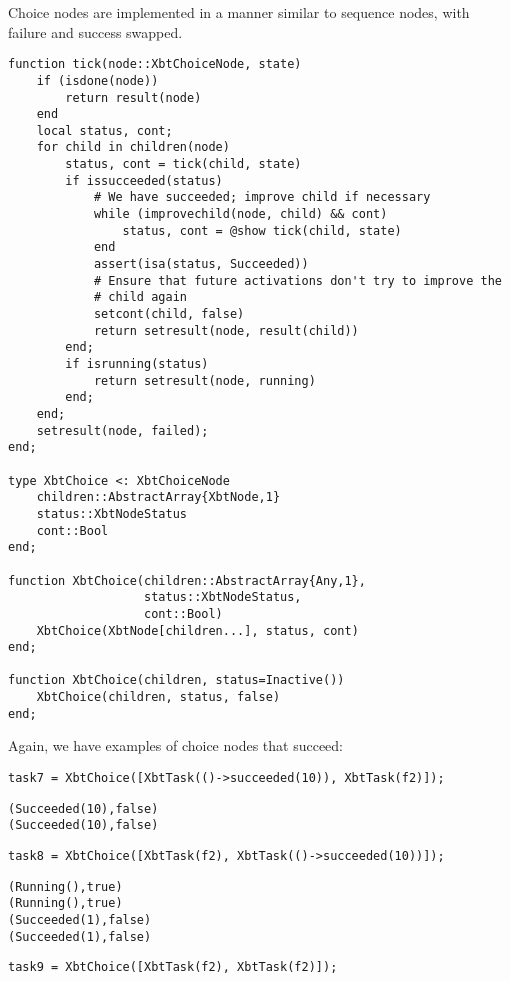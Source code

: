 \documentclass[a4wide]{article}
\begin{document}
Choice nodes are implemented in a manner similar to sequence
nodes, with failure and success swapped.

\begin{verbatim}
function tick(node::XbtChoiceNode, state)
    if (isdone(node))
        return result(node)
    end
    local status, cont;
    for child in children(node)
        status, cont = tick(child, state)
        if issucceeded(status)
            # We have succeeded; improve child if necessary
            while (improvechild(node, child) && cont)
                status, cont = @show tick(child, state)
            end
            assert(isa(status, Succeeded))
            # Ensure that future activations don't try to improve the
            # child again
            setcont(child, false)
            return setresult(node, result(child))
        end;
        if isrunning(status)
            return setresult(node, running)
        end;
    end;
    setresult(node, failed);
end;

type XbtChoice <: XbtChoiceNode
    children::AbstractArray{XbtNode,1}
    status::XbtNodeStatus
    cont::Bool
end;

function XbtChoice(children::AbstractArray{Any,1},
                   status::XbtNodeStatus,
                   cont::Bool)
    XbtChoice(XbtNode[children...], status, cont)
end;

function XbtChoice(children, status=Inactive())
    XbtChoice(children, status, false)
end;
\end{verbatim}

Again, we have examples of choice nodes that succeed:

\begin{verbatim}
task7 = XbtChoice([XbtTask(()->succeeded(10)), XbtTask(f2)]);
\end{verbatim}

\begin{verbatim}
(Succeeded(10),false)
(Succeeded(10),false)
\end{verbatim}

\begin{verbatim}
task8 = XbtChoice([XbtTask(f2), XbtTask(()->succeeded(10))]);
\end{verbatim}

\begin{verbatim}
(Running(),true)
(Running(),true)
(Succeeded(1),false)
(Succeeded(1),false)
\end{verbatim}

\begin{verbatim}
task9 = XbtChoice([XbtTask(f2), XbtTask(f2)]);
\end{verbatim}
\end{document}
